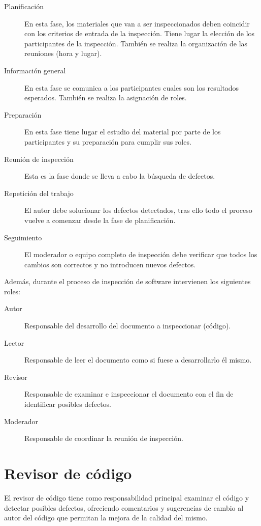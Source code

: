 \begin{description}
	\item[Planificación] En esta fase, los materiales que van a ser inspeccionados deben coincidir con los criterios de entrada de la inspección. Tiene lugar la elección de los participantes de la inspección. También se realiza la organización de las reuniones (hora y lugar).
	\item[Información general] En esta fase se comunica a los participantes cuales son los resultados esperados. También se realiza la asignación de roles.
	\item[Preparación] En esta fase tiene lugar el estudio del material por parte de los participantes y su preparación para cumplir sus roles.
	\item[Reunión de inspección] Esta es la fase donde se lleva a cabo la búsqueda de defectos.
	\item[Repetición del trabajo] El autor debe solucionar los defectos detectados, tras ello todo el proceso vuelve a comenzar desde la fase de planificación.
	\item[Seguimiento] El moderador o equipo completo de inspección debe verificar que todos los cambios son correctos y no introducen nuevos defectos.
\end{description}


Además, durante el proceso de inspección de software intervienen los siguientes roles:

\begin{description}
	\item[Autor] Responsable del desarrollo del documento a inspeccionar (código).
	\item[Lector] Responsable de leer el documento como si fuese a desarrollarlo él mismo.
	\item[Revisor] Responsable de examinar e inspeccionar el documento con el fin de identificar posibles defectos.
	\item[Moderador] Responsable de coordinar la reunión de inspección.
\end{description}

\section{Revisor de código}

El revisor de código tiene como responsabilidad principal examinar el código y detectar posibles defectos, ofreciendo comentarios y sugerencias de cambio al autor del código que permitan la mejora de la calidad del mismo.

